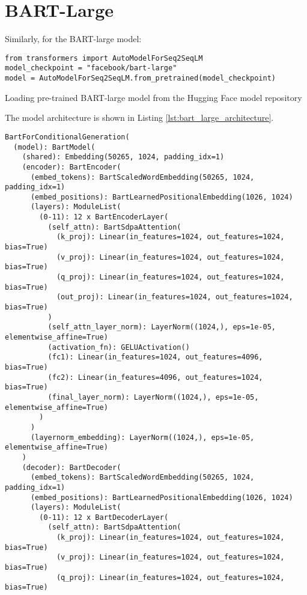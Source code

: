 \section*{BART-Large}
Similarly, for the BART-large model:
\begin{listing}[H]
    \begin{verbatim}
from transformers import AutoModelForSeq2SeqLM
model_checkpoint = "facebook/bart-large"
model = AutoModelForSeq2SeqLM.from_pretrained(model_checkpoint)
    \end{verbatim}
    \caption{Loading pre-trained BART-large model from the Hugging Face model repository}
    \label{lst:bart_large_fetch}
\end{listing}
    The model architecture is shown in Listing \ref{lst:bart_large_architecture}.
        \begin{listing}[H]
                \begin{verbatim}
BartForConditionalGeneration(
  (model): BartModel(
    (shared): Embedding(50265, 1024, padding_idx=1)
    (encoder): BartEncoder(
      (embed_tokens): BartScaledWordEmbedding(50265, 1024, padding_idx=1)
      (embed_positions): BartLearnedPositionalEmbedding(1026, 1024)
      (layers): ModuleList(
        (0-11): 12 x BartEncoderLayer(
          (self_attn): BartSdpaAttention(
            (k_proj): Linear(in_features=1024, out_features=1024, bias=True)
            (v_proj): Linear(in_features=1024, out_features=1024, bias=True)
            (q_proj): Linear(in_features=1024, out_features=1024, bias=True)
            (out_proj): Linear(in_features=1024, out_features=1024, bias=True)
          )
          (self_attn_layer_norm): LayerNorm((1024,), eps=1e-05, elementwise_affine=True)
          (activation_fn): GELUActivation()
          (fc1): Linear(in_features=1024, out_features=4096, bias=True)
          (fc2): Linear(in_features=4096, out_features=1024, bias=True)
          (final_layer_norm): LayerNorm((1024,), eps=1e-05, elementwise_affine=True)
        )
      )
      (layernorm_embedding): LayerNorm((1024,), eps=1e-05, elementwise_affine=True)
    )
    (decoder): BartDecoder(
      (embed_tokens): BartScaledWordEmbedding(50265, 1024, padding_idx=1)
      (embed_positions): BartLearnedPositionalEmbedding(1026, 1024)
      (layers): ModuleList(
        (0-11): 12 x BartDecoderLayer(
          (self_attn): BartSdpaAttention(
            (k_proj): Linear(in_features=1024, out_features=1024, bias=True)
            (v_proj): Linear(in_features=1024, out_features=1024, bias=True)
            (q_proj): Linear(in_features=1024, out_features=1024, bias=True)

\end{verbatim}
\end{listing}
